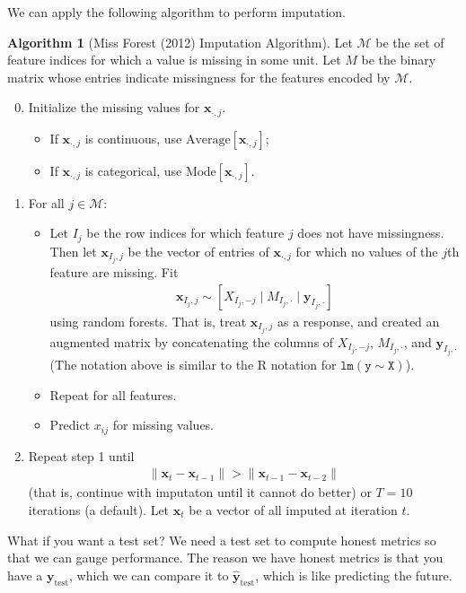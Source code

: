 \documentclass[12pt, a4paper]{article}
\theoremstyle{definition}
\newtheorem{algorithm}{Algorithm}
\begin{document}
	We can apply the following algorithm to perform imputation.
	\begin{tcolorbox}
		\begin{algorithm}[Miss Forest (2012) Imputation Algorithm]
			Let $\mathcal{M}$ be the set of feature indices for which a
			value is missing in some unit. Let $M$ be the binary matrix
			whose entries indicate missingness for the features encoded by
			$\mathcal{M}$.
			\begin{enumerate}[label=\textbf{(\arabic*)}]
				\setcounter{enumi}{-1}
				\item Initialize the missing values for $\bm{x}_{\cdot, j}$.
				\begin{itemize}
					\item If $\bm{x}_{\cdot, j}$ is continuous, use
					$\text{Average}[\bm{x}_{\cdot, j}]$;
					\item If $\bm{x}_{\cdot, j}$ is categorical, use
					$\text{Mode}[\bm{x}_{\cdot, j}]$.
				\end{itemize}
				\item For all $j\in \mathcal{M}$:
				\begin{itemize}
					\item Let $I_j$ be the row indices for which feature $j$
					does not have missingness. Then let $\bm{x}_{I_j, j}$ be
					the vector of entries of $\bm{x}_{\cdot, j}$ for which no
					values of the $j$th feature are missing.
					Fit
					\begin{align*}
						\bm{x}_{I_j, j}\sim [X_{I_j,-j}\mid M_{I_j, \cdot} \mid \bm{y}_{I_j, \cdot}]
					\end{align*}
					using random forests. That is, treat $\bm{x}_{I_j, j}$ as
					a response, and created an augmented matrix by concatenating
					the columns of $X_{I_j,-j}$, $M_{I_j, \cdot}$, and $\bm{y}_{I_j, \cdot}$
					(The notation above is similar to the R notation for
					$\mathtt{lm(y \sim  X)}$).
					\item Repeat for all features.
					\item Predict $x_{ij}$ for missing values.
				\end{itemize}
				\item Repeat step 1 until 
				\begin{align*}
					\|\bm{x}_t - \bm{x}_{t-1}\| > \|\bm{x}_{t-1} - \bm{x}_{t-2}\|
				\end{align*}
				(that is, continue with imputaton until it cannot do better)
				or $T = 10$ iterations (a default). Let $\bm{x}_t$ be a vector of
				all imputed at iteration $t$.
			\end{enumerate}
		\end{algorithm}
	\end{tcolorbox}
	What if you want a test set? We need a test set to compute honest metrics so that
	we can gauge performance. The reason we have honest metrics is that you have a
	$\bm{y}_{\text{test}}$, which we can compare it to $\hat{\bm{y}}_{\text{test}}$,
	which is like predicting the future.
	
\end{document}
